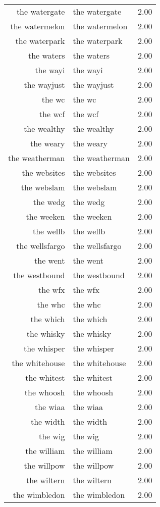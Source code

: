 \begin{table}[ht]
\begin{tabular}{rlr}
  the watergate & the watergate & 2.00 \\ 
  the watermelon & the watermelon & 2.00 \\ 
  the waterpark & the waterpark & 2.00 \\ 
  the waters & the waters & 2.00 \\ 
  the wayi & the wayi & 2.00 \\ 
  the wayjust & the wayjust & 2.00 \\ 
  the wc & the wc & 2.00 \\ 
  the wcf & the wcf & 2.00 \\ 
  the wealthy & the wealthy & 2.00 \\ 
  the weary & the weary & 2.00 \\ 
  the weatherman & the weatherman & 2.00 \\ 
  the websites & the websites & 2.00 \\ 
  the webslam & the webslam & 2.00 \\ 
  the wedg & the wedg & 2.00 \\ 
  the weeken & the weeken & 2.00 \\ 
  the wellb & the wellb & 2.00 \\ 
  the wellsfargo & the wellsfargo & 2.00 \\ 
  the went & the went & 2.00 \\ 
  the westbound & the westbound & 2.00 \\ 
  the wfx & the wfx & 2.00 \\ 
  the whc & the whc & 2.00 \\ 
  the which & the which & 2.00 \\ 
  the whisky & the whisky & 2.00 \\ 
  the whisper & the whisper & 2.00 \\ 
  the whitehouse & the whitehouse & 2.00 \\ 
  the whitest & the whitest & 2.00 \\ 
  the whoosh & the whoosh & 2.00 \\ 
  the wiaa & the wiaa & 2.00 \\ 
  the width & the width & 2.00 \\ 
  the wig & the wig & 2.00 \\ 
  the william & the william & 2.00 \\ 
  the willpow & the willpow & 2.00 \\ 
  the wiltern & the wiltern & 2.00 \\ 
  the wimbledon & the wimbledon & 2.00 \\ 

\end{tabular}
\end{table}

